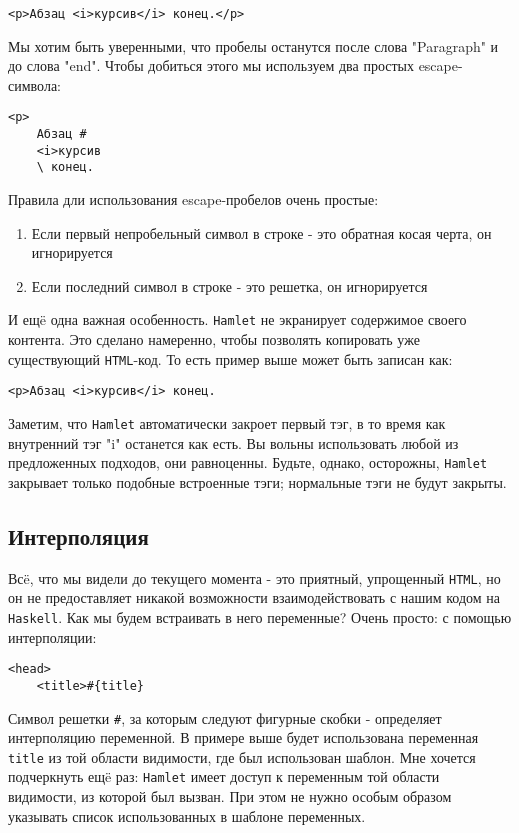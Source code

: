 \begin{lstlisting}
<p>Абзац <i>курсив</i> конец.</p>
\end{lstlisting}

Мы хотим быть уверенными, что пробелы останутся после слова "Paragraph" и
до слова "end". Чтобы добиться этого мы используем два простых escape-символа:

\begin{lstlisting}
<p>
    Абзац #
    <i>курсив
    \ конец.
\end{lstlisting}

Правила дли использования escape-пробелов очень простые:
\begin{enumerate}
\item Если первый непробельный символ в строке - это обратная косая черта,
он игнорируется
\item Если последний символ в строке - это решетка, он игнорируется
\end{enumerate}

И ещë одна важная особенность. \texttt{Hamlet} не экранирует содержимое своего контента.
Это сделано намеренно, чтобы позволять копировать уже существующий \texttt{HTML}-код.
То есть пример выше может быть записан как:
\begin{lstlisting}
<p>Абзац <i>курсив</i> конец.
\end{lstlisting}

Заметим, что \texttt{Hamlet} автоматически закроет первый тэг, в то время как внутренний
тэг "i" останется как есть. Вы вольны использовать любой из предложенных
подходов, они равноценны. Будьте, однако, осторожны, \texttt{Hamlet} закрывает только
подобные встроенные тэги; нормальные тэги не будут закрыты.

\subsection{Интерполяция}
Всë, что мы видели до текущего момента - это приятный, упрощенный \texttt{HTML}, но он
не предоставляет никакой возможности взаимодействовать с нашим кодом на \texttt{Haskell}.
Как мы будем встраивать в него переменные? Очень просто: с помощью интерполяции:

\begin{lstlisting}
<head>
    <title>#{title}
\end{lstlisting}

Символ решетки \verb'#', за которым следуют фигурные скобки - определяет интерполяцию
переменной. В примере выше будет использована переменная \lstinline!title! из той
области видимости, где был использован шаблон. Мне хочется подчеркнуть ещë раз:
\texttt{Hamlet} имеет доступ к переменным той области видимости, из которой был вызван.
При этом не нужно особым образом указывать список использованных в шаблоне переменных.

